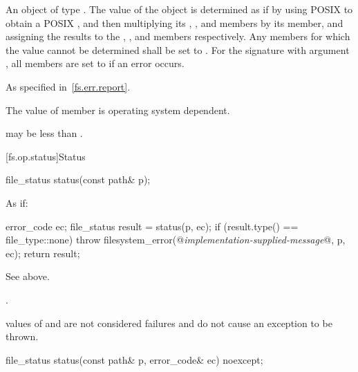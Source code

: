 \begin{itemdescr}
\pnum
\returns
An object of type . The value of the 
  object is determined as if by using POSIX 
  to obtain a POSIX ,
  and then multiplying its , ,
  and  members by its  member,
  and assigning the results to the , ,
  and  members respectively. Any members for which the
  value cannot be determined shall be set to .
  For the signature with argument , all members are set to
   if an error occurs.

\pnum
\throws
As specified in~\ref{fs.err.report}.

\pnum
\remarks
The value of member 
      is operating system dependent.
\begin{note}
 may be
      less than .
\end{note}
\end{itemdescr}


[fs.op.status]{Status}

%
\begin{itemdecl}
file_status status(const path& p);
\end{itemdecl}

\begin{itemdescr}
\pnum
\effects
As if:
\begin{codeblock}
error_code ec;
file_status result = status(p, ec);
if (result.type() == file_type::none)
  throw filesystem_error(@\textit{implementation-supplied-message}@, p, ec);
return result;
\end{codeblock}

\pnum
\returns
See above.

\pnum
\throws
{}.
\begin{note}
 values of 
  and  are not considered failures and do not
  cause an exception to be thrown.
\end{note}
\end{itemdescr}

%
\begin{itemdecl}
file_status status(const path& p, error_code& ec) noexcept;
\end{itemdecl}

